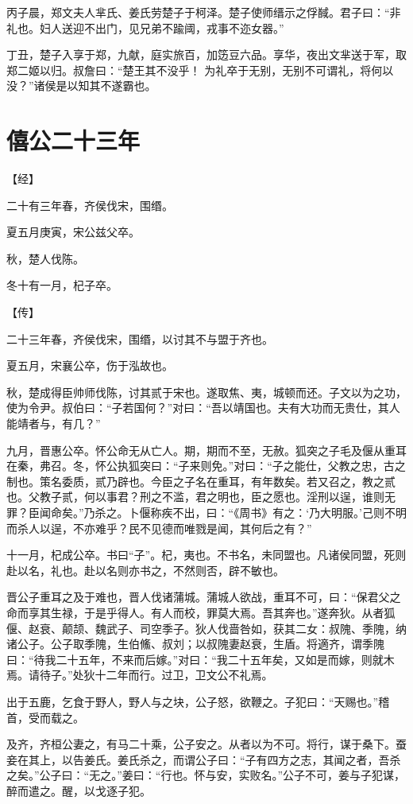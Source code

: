 \documentclass[a4paper,12pt,UTF8,twoside]{ctexbook}
\begin{document}
丙子晨，郑文夫人芈氏、姜氏劳楚子于柯泽。楚子使师缙示之俘馘。君子曰：“非礼也。妇人送迎不出门，见兄弟不踰阈，戎事不迩女器。”

丁丑，楚子入享于郑，九献，庭实旅百，加笾豆六品。享华，夜出文芈送于军，取郑二姬以归。叔詹曰：“楚王其不没乎！ 为礼卒于无别，无别不可谓礼，将何以没？”诸侯是以知其不遂霸也。


\chapter{僖公二十三年}



【经】

二十有三年春，齐侯伐宋，围缗。

夏五月庚寅，宋公兹父卒。

秋，楚人伐陈。

冬十有一月，杞子卒。

【传】

二十三年春，齐侯伐宋，围缗，以讨其不与盟于齐也。

夏五月，宋襄公卒，伤于泓故也。

秋，楚成得臣帅师伐陈，讨其贰于宋也。遂取焦、夷，城顿而还。子文以为之功，使为令尹。叔伯曰：“子若国何？”对曰：“吾以靖国也。夫有大功而无贵仕，其人能靖者与，有几？”

九月，晋惠公卒。怀公命无从亡人。期，期而不至，无赦。狐突之子毛及偃从重耳在秦，弗召。冬，怀公执狐突曰：“子来则免。”对曰：“子之能仕，父教之忠，古之制也。策名委质，贰乃辟也。今臣之子名在重耳，有年数矣。若又召之，教之贰也。父教子贰，何以事君？刑之不滥，君之明也，臣之愿也。淫刑以逞，谁则无罪？臣闻命矣。”乃杀之。卜偃称疾不出，曰：“《周书》有之：‘乃大明服。’己则不明而杀人以逞，不亦难乎？民不见德而唯戮是闻，其何后之有？”

十一月，杞成公卒。书曰“子”。杞，夷也。不书名，未同盟也。凡诸侯同盟，死则赴以名，礼也。赴以名则亦书之，不然则否，辟不敏也。

晋公子重耳之及于难也，晋人伐诸蒲城。蒲城人欲战，重耳不可，曰：“保君父之命而享其生禄，于是乎得人。有人而校，罪莫大焉。吾其奔也。”遂奔狄。从者狐偃、赵衰、颠颉、魏武子、司空季子。狄人伐啬咎如，获其二女：叔隗、季隗，纳诸公子。公子取季隗，生伯鯈、叔刘；以叔隗妻赵衰，生盾。将適齐，谓季隗曰：“待我二十五年，不来而后嫁。”对曰：“我二十五年矣，又如是而嫁，则就木焉。请待子。”处狄十二年而行。过卫，卫文公不礼焉。

出于五鹿，乞食于野人，野人与之块，公子怒，欲鞭之。子犯曰：“天赐也。”稽首，受而载之。

及齐，齐桓公妻之，有马二十乘，公子安之。从者以为不可。将行，谋于桑下。蚕妾在其上，以告姜氏。姜氏杀之，而谓公子曰：“子有四方之志，其闻之者，吾杀之矣。”公子曰：“无之。”姜曰：“行也。怀与安，实败名。”公子不可，姜与子犯谋，醉而遣之。醒，以戈逐子犯。
\end{document}

